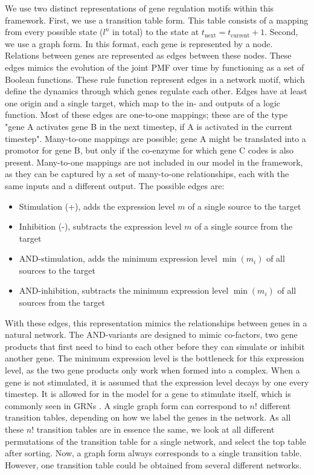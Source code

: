 \documentclass[../main.tex]{subfiles}
\begin{document}
We use two distinct representations of gene regulation motifs within this framework.
First, we use a transition table form.
This table consists of a mapping from every possible state ($l^n$ in total) to the state at $t_\mathrm{next} = t_\mathrm{current} + 1$.
Second, we use a graph form.
In this format, each gene is represented by a node.
Relations between genes are represented as edges between these nodes.
These edges mimics the evolution of the joint PMF over time by functioning as a set of Boolean functions.
These rule function represent edges in a network motif, which define the dynamics through which genes regulate each other.
Edges have at least one origin and a single target, which map to the in- and outputs of a logic function.
Most of these edges are one-to-one mappings; these are of the type "gene A activates gene B in the next timestep, if A is activated in the current timestep".
Many-to-one mappings are possible; gene A might be translated into a promotor for gene B, but only if the co-enzyme for which gene C codes is also present.
Many-to-one mappings are not included in our model in the framework, as they can be captured by a set of many-to-one relationships, each with the same inputs and a different output.
The possible edges are:
%
\begin{itemize}
\item Stimulation (+), adds the expression level $m$ of a single source to the target
\item Inhibition (-), subtracts the expression level $m$ of a single source from the target
\item AND-stimulation, adds the minimum expression level $\min(m_i)$ of all sources to the target
\item AND-inhibition, subtracts the minimum expression level $\min(m_i)$ of all sources from the target
\end{itemize}
%
With these edges, this representation mimics the relationships between genes in a natural network.
The AND-variants are designed to mimic co-factors, two gene products that first need to bind to each other before they can simulate or inhibit another gene.
The minimum expression level is the bottleneck for this expression level, as the two gene products only work when formed into a complex.
When a gene is not stimulated, it is assumed that the expression level decays by one every timestep.
It is allowed for in the model for a gene to stimulate itself, which is commonly seen in GRNs \cite{}.
A single graph form can correspond to $n!$ different transition tables, depending on how we label the genes in the network.
As all these $n!$ transition tables are in essence the same, we look at all different permutations of the transition table for a single network, and select the top table after sorting.
Now, a graph form always corresponds to a single transition table. 
However, one transition table could be obtained from several different networks.
\end{document}
